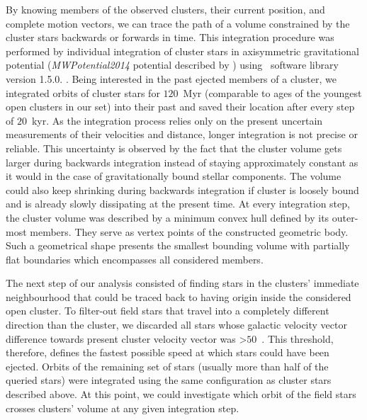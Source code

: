 By knowing members of the observed clusters, their current position, and complete motion vectors, we can trace the path of a volume constrained by the cluster stars backwards or forwards in time. This integration procedure was performed by individual integration of cluster stars in axisymmetric gravitational potential (\textit{MWPotential2014} potential described by \citet{2015ApJS..216...29B}) using \GP\ software library version 1.5.0. \cite{2015ApJS..216...29B}. Being interested in the past ejected members of a cluster, we integrated orbits of cluster stars for $120$~Myr (comparable to ages of the youngest open clusters in our set) into their past and saved their location after every step of $20$~kyr. As the integration process relies only on the present uncertain measurements of their velocities and distance, longer integration is not precise or reliable. This uncertainty is observed by the fact that the cluster volume gets larger during backwards integration instead of staying approximately constant as it would in the case of gravitationally bound stellar components. The volume could also keep shrinking during backwards integration if cluster is loosely bound and is already slowly dissipating at the present time. At every integration step, the cluster volume was described by a minimum convex hull defined by its outer-most members. They serve as vertex points of the constructed geometric body. Such a geometrical shape presents the smallest bounding volume with partially flat boundaries which encompasses all considered members.

The next step of our analysis consisted of finding stars in the clusters' immediate neighbourhood that could be traced back to having origin inside the considered open cluster. To filter-out field stars that travel into a completely different direction than the cluster, we discarded all stars whose galactic velocity vector difference towards present cluster velocity vector was >$50$~\kms. This threshold, therefore, defines the fastest possible speed at which stars could have been ejected. Orbits of the remaining set of stars (usually more than half of the queried stars) were integrated using the same configuration as cluster stars described above. At this point, we could investigate which orbit of the field stars crosses clusters' volume at any given integration step.

